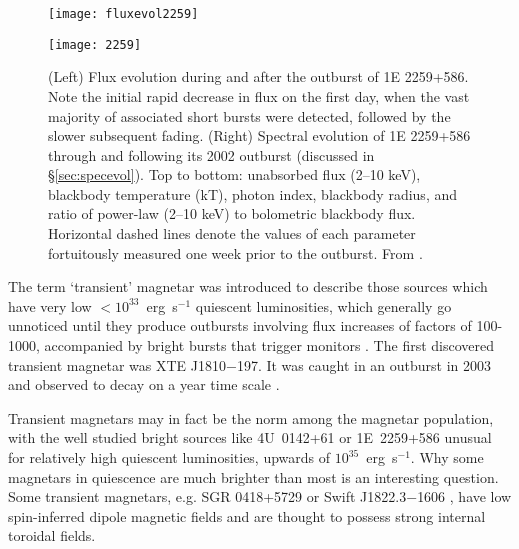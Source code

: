 \begin{figure}
\begin{minipage}{2.9in}
\texttt{[image: fluxevol2259]}
\end{minipage}
\hfill
\hspace{-0.75in}
\begin{minipage}{2.9in}
\hspace{.35in}
\texttt{[image: 2259]}
\end{minipage}
\caption{(Left) Flux evolution during and after the outburst of 1E 2259+586.
Note the initial rapid decrease in flux on the first day, when the vast majority of associated short bursts were detected, followed by the slower
subsequent fading. 
(Right) Spectral evolution of 1E 2259+586 through and following its 2002 outburst (discussed in \S\ref{sec:specevol}).
Top to bottom: unabsorbed flux (2–10 keV), blackbody temperature (kT),
photon index, blackbody radius, and ratio of power-law (2–10 keV) to bolometric blackbody flux.
Horizontal dashed lines denote the values of each parameter fortuitously measured
one week prior to the outburst.  From \citet{wkt+04}.
}
\label{fig:outburst}
\end{figure}

The term `transient' magnetar was introduced to describe those sources which have very low
$< 10^{33}$~erg~s$^{-1}$ quiescent luminosities, which generally go unnoticed until they produce
outbursts involving flux increases of factors of 100-1000, accompanied by bright bursts that 
trigger monitors \citep[e.g.][]{mgz+13}.
The first discovered transient magnetar was XTE J1810$-$197.  It was caught in an outburst in 2003
\citep{ims+04} and observed to decay on a year time scale
\citep{gh07}. 

Transient magnetars may in fact be the norm among the magnetar population, with the
well studied bright sources like 4U~0142+61 or 1E~2259+586 unusual for relatively high
quiescent luminosities, upwards of $10^{35}$~erg~s$^{-1}$.  Why some magnetars in quiescence
are much brighter than most is an interesting question.
Some transient magnetars, e.g. SGR 0418+5729 \citep{ret+10} or Swift J1822.3$-$1606
\citep{rie+12,skc14}, have low spin-inferred dipole magnetic fields and are thought to possess
strong internal toroidal fields.

